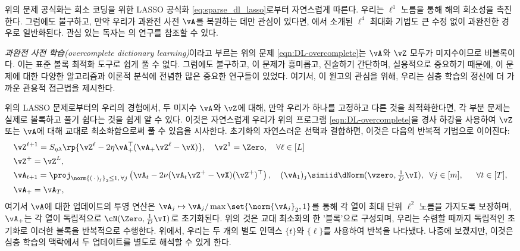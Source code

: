 \documentclass[../../book-main_ko.tex]{subfiles}
\begin{document}
\begin{remark}
위의 문제 공식화는 희소 코딩을 위한 LASSO 공식화 \eqref{eq:sparse_dl_lasso}로부터 자연스럽게 따른다. 우리는 \(\ell^1\) 노름을 통해 해의 희소성을 촉진한다. 그럼에도 불구하고, 만약 우리가 과완전 사전 \(\vA\)를 복원하는 데만 관심이 있다면, 에서 소개된 \(\ell^4\) 최대화 기법도 큰 수정 없이 과완전한 경우로 일반화된다. 관심 있는 독자는 \cite{Qu2020Geometric}의 연구를 참조할 수 있다.
\end{remark}

\textit{과완전 사전 학습(overcomplete dictionary learning)}이라고 부르는 위의 문제 \eqref{eqn:DL-overcomplete}는 \(\vA\)와 \(\vZ\) 모두가 미지수이므로 비볼록이다. 이는 표준 볼록 최적화 도구로 쉽게 풀 수 없다. 그럼에도 불구하고, 이 문제가 흥미롭고, 진술하기 간단하며, 실용적으로 중요하기 때문에, 이 문제에 대한 다양한 알고리즘과 이론적 분석에 전념한 많은 중요한 연구들이 있었다. 여기서, 이 원고의 관심을 위해, 우리는 심층 학습의 정신에 더 가까운 관용적 접근법을 제시한다.

위의 LASSO 문제로부터의 우리의 경험에서, 두 미지수 \(\vA\)와 \(\vZ\)에 대해, 만약 우리가 하나를 고정하고 다른 것을 최적화한다면, 각 부분 문제는 실제로 볼록하고 풀기 쉽다는 것을 쉽게 알 수 있다. 이것은 자연스럽게 우리가 위의 프로그램 \eqref{eqn:DL-overcomplete}을 경사 하강을 사용하여 \(\vZ\) 또는 \(\vA\)에 대해 교대로 최소화함으로써 풀 수 있음을 시사한다. 초기화의 자연스러운 선택과 결합하면, 이것은 다음의 반복적 기법으로 이어진다:
\begin{align}
    &\vZ^{\ell + 1} = S_{\eta\lambda}\rp{\vZ^{\ell}
    - 2\eta\vA_{+}^{\top}(\vA_{+}\vZ^{\ell} - \vX)},
    \quad \vZ^1 = \Zero,
    \quad \forall \ell \in [L] \label{eqn:ISTA-update}\\
    &\vZ^+ = \vZ^L,\\
    &\vA_{t + 1} = \proj_{\norm{(\,\cdot\,)_j}_2 \leq 1,\,\forall j}\left(
    \vA_{t} - 2\nu (\vA_{t}\vZ^+ - \vX)(\vZ^+)^\top
    \right),
    \quad (\vA_{1})_j \simiid \dNorm(\vzero, \tfrac{1}{D}\vI), \enspace \forall
    j \in [m],
    \quad\;\; \forall t \in [T],\label{eqn:DL-update}\\
    &\vA_+ = \vA_T,
\end{align}
여기서 $\vA$에 대한 업데이트의 투영 연산은 $\vA_j \mapsto \vA_j / \max \set{\norm{\vA_j}_2, 1}$를 통해 각 열이 최대 단위 $\ell^2$ 노름을 가지도록 보장하며, $\vA_+$는 각 열이 독립적으로 $\cN(\Zero, \tfrac{1}{D} \vI)$로 초기화된다. 위의 것은 교대 최소화의 한 '블록'으로 구성되며, 우리는 수렴할 때까지 독립적인 초기화로 이러한 블록을 반복적으로 수행한다. 위에서, 우리는 두 개의 별도 인덱스 $\{t\}$와 $\{\ell\}$를 사용하여 반복을 나타냈다. 나중에 보겠지만, 이것은 심층 학습의 맥락에서 두 업데이트를 별도로 해석할 수 있게 한다.
\end{document}
